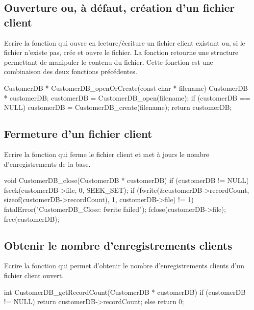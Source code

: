 \subsection{Ouverture ou, à défaut, création d'un fichier client}

Ecrire la fonction  qui ouvre en lecture/écriture un fichier client existant ou, si le fichier n'existe pas, crée et ouvre le fichier. La fonction retourne une structure permettant de manipuler le contenu du fichier. Cette fonction est une combinaison des deux fonctions précédentes.

\begin{csourcecorrection}
CustomerDB * CustomerDB_openOrCreate(const char * filename) {
    CustomerDB * customerDB;
    customerDB = CustomerDB_open(filename);
    if (customerDB == NULL)
        customerDB = CustomerDB_create(filename);
    return customerDB;
}
\end{csourcecorrection}

\subsection{Fermeture d'un fichier client}

Ecrire la fonction  qui ferme le fichier client et met à jours le nombre d'enregistrements de la base.

\begin{csourcecorrection}
void CustomerDB_close(CustomerDB * customerDB) {
    if (customerDB != NULL) {
        fseek(customerDB->file, 0, SEEK_SET);
        if (fwrite(&customerDB->recordCount, sizeof(customerDB->recordCount), 1, customerDB->file)
                != 1)
            fatalError("CustomerDB_Close: fwrite failed");
        fclose(customerDB->file);
        free(customerDB);
    }
}
\end{csourcecorrection}

\subsection{Obtenir le nombre d'enregistrements clients}

Ecrire la fonction  qui permet d'obtenir le \linebreak nom\-bre d'enregistrements clients d'un fichier client ouvert.

\begin{csourcecorrection}
int CustomerDB_getRecordCount(CustomerDB * customerDB) {
    if (customerDB != NULL)
        return customerDB->recordCount;
    else
        return 0;
}
\end{csourcecorrection}

